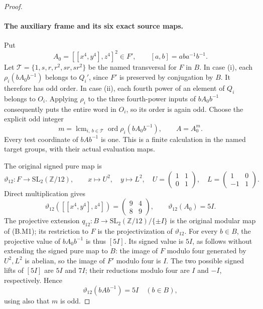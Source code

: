 \begin{proof}
\paragraph{The auxiliary frame and its six exact source maps.}
Put
\[
             A_0=[[x^4,y^4],z^4]^2\in F',
 \qquad [a,b]=aba^{-1}b^{-1}.
                                                               \tag{OGS.6}
\]
Let $\mathcal T=\{1,s,r,r^2,sr,sr^2\}$ be the named
transversal for $F$ in $B$.
In case (i), each $\rho_i(bA_0b^{-1})$ belongs to
$Q_i'$, since $F'$ is preserved by conjugation by $B$.
It therefore has odd order.
In case (ii), each fourth power of an element of
$Q_i$ belongs to $O_i$.
Applying $\rho_i$ to the three fourth-power inputs
of $bA_0b^{-1}$ consequently puts the entire word in
$O_i$, so its order is again odd.
Choose the explicit odd integer
\[
 m=\mathop{\mathrm{lcm}}_{i,\ b\in\mathcal T}
                    \operatorname{ord}\rho_i(bA_0b^{-1}),
 \qquad A=A_0^m.
                                                               \tag{OGS.7}
\]
Every test coordinate of $bAb^{-1}$ is one.
This is a finite calculation in the named target
groups, with their actual evaluation maps.

The original signed pure map is
\[
 \vartheta_{12}:F\to\mathrm{SL}_2(\mathbb Z/12),
 \qquad x\mapsto U^2,\quad y\mapsto L^2,\quad
 U=\begin{pmatrix}1&1\\0&1\end{pmatrix},\quad
 L=\begin{pmatrix}1&0\\-1&1\end{pmatrix}.
\]
Direct multiplication gives
\[
 \vartheta_{12}([[x^4,y^4],z^4])
       =\begin{pmatrix}9&4\\8&9\end{pmatrix},\qquad
 \vartheta_{12}(A_0)=5I .
                                                               \tag{OGS.8}
\]
The projective extension
$q_{12}:B\to\mathrm{SL}_2(\mathbb Z/12)/\{\pm I\}$
is the original modular map of (B.M1); its
restriction to $F$ is the projectivization of
$\vartheta_{12}$.
For every $b\in B$, the projective value of
$bA_0b^{-1}$ is thus $[5I]$.
Its signed value is $5I$, as follows without
extending the signed pure map to $B$:
the image of $F$ modulo four generated by $U^2,L^2$
is abelian, so the image of $F'$ modulo four is
$I$.  The two possible signed lifts of $[5I]$
are $5I$ and $7I$; their reductions modulo four
are $I$ and $-I$, respectively.
Hence
\[
          \vartheta_{12}(bAb^{-1})=5I
                       \quad(b\in B),
                                                               \tag{OGS.9}
\]
using also that $m$ is odd.


\end{proof}
